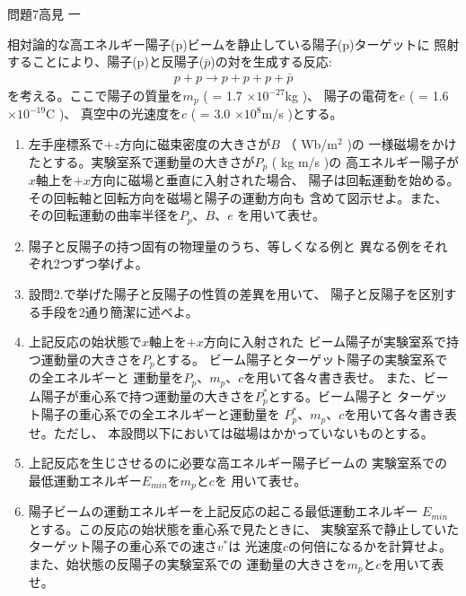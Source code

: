 \documentclass[fleqn]{jbook}
\begin{document}
\begin{question}{問題7}{高見 一}

相対論的な高エネルギー陽子(p)ビームを静止している陽子(p)ターゲットに
照射することにより、陽子(p)と反陽子($\bar{p}$)の対を生成する反応:
\begin{eqnarray*}
p + p \longrightarrow p + p + p + \bar{p}
\end{eqnarray*}
を考える。ここで陽子の質量を$m_p$ ( = 1.7 $\times 10^{-27}$kg )、
陽子の電荷を$e$ ( = 1.6 $\times 10^{-19}$C )、
真空中の光速度を$c$ ( = 3.0 $\times 10^8$m/s )とする。

\begin{enumerate}
\item 左手座標系で$+z$方向に磁束密度の大きさが$B$ （ Wb/m$^2$ )の
一様磁場をかけたとする。実験室系で運動量の大きさが$P_p$ ( kg m/s )の
高エネルギー陽子が$x$軸上を$+x$方向に磁場と垂直に入射された場合、
陽子は回転運動を始める。その回転軸と回転方向を磁場と陽子の運動方向も
含めて図示せよ。また、その回転運動の曲率半径を$P_p$、$B$、$e$
を用いて表せ。

\item 陽子と反陽子の持つ固有の物理量のうち、等しくなる例と
異なる例をそれぞれ2つずつ挙げよ。

\item 設問2.で挙げた陽子と反陽子の性質の差異を用いて、
陽子と反陽子を区別する手段を2通り簡潔に述べよ。

\item 上記反応の始状態で$x$軸上を$+x$方向に入射された
ビーム陽子が実験室系で持つ運動量の大きさを$P_p$とする。
ビーム陽子とターゲット陽子の実験室系での全エネルギーと
運動量を$P_p$、$m_p$、$c$を用いて各々書き表せ。
また、ビーム陽子が重心系で持つ運動量の大きさを$P_p^*$とする。ビーム陽子と
ターゲット陽子の重心系での全エネルギーと運動量を
$P_p^*$、$m_p$、$c$を用いて各々書き表せ。ただし、
本設問以下においては磁場はかかっていないものとする。

\item 上記反応を生じさせるのに必要な高エネルギー陽子ビームの
実験室系での最低運動エネルギー$E_{min}$を$m_p$と$c$を
用いて表せ。

\item 陽子ビームの運動エネルギーを上記反応の起こる最低運動エネルギー
$E_{min}$とする。この反応の始状態を重心系で見たときに、
実験室系で静止していたターゲット陽子の重心系での速さ$v^*$は
光速度$c$の何倍になるかを計算せよ。また、始状態の反陽子の実験室系での
運動量の大きさを$m_p$と$c$を用いて表せ。
\end{enumerate}
\end{question}
\end{document}
